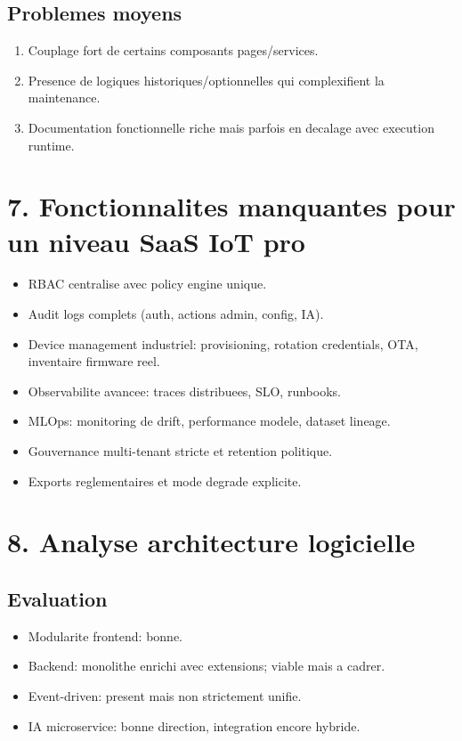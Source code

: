 \documentclass[12pt,a4paper]{article}
\begin{document}
\subsection{Problemes moyens}
\begin{enumerate}
  \item Couplage fort de certains composants pages/services.
  \item Presence de logiques historiques/optionnelles qui complexifient la maintenance.
  \item Documentation fonctionnelle riche mais parfois en decalage avec execution runtime.
\end{enumerate}

\section{7. Fonctionnalites manquantes pour un niveau SaaS IoT pro}
\begin{itemize}
  \item RBAC centralise avec policy engine unique.
  \item Audit logs complets (auth, actions admin, config, IA).
  \item Device management industriel: provisioning, rotation credentials, OTA, inventaire firmware reel.
  \item Observabilite avancee: traces distribuees, SLO, runbooks.
  \item MLOps: monitoring de drift, performance modele, dataset lineage.
  \item Gouvernance multi-tenant stricte et retention politique.
  \item Exports reglementaires et mode degrade explicite.
\end{itemize}

\section{8. Analyse architecture logicielle}
\subsection{Evaluation}
\begin{itemize}
  \item Modularite frontend: bonne.
  \item Backend: monolithe enrichi avec extensions; viable mais a cadrer.
  \item Event-driven: present mais non strictement unifie.
  \item IA microservice: bonne direction, integration encore hybride.
\end{itemize}
\end{document}
